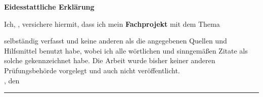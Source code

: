 \clearpage
\vspace*{\fill}
\LARGE{\textbf{Eidesstattliche Erklärung}}\\[1ex]
\normalsize



Ich, \authorName, versichere hiermit, dass ich mein \textbf{Fachprojekt} mit dem
Thema
\begin{quote}
\textit{\completeTitle}
\end{quote}
selbständig verfasst und keine anderen als die angegebenen Quellen und Hilfsmittel benutzt habe,
wobei ich alle wörtlichen und sinngemäßen Zitate als solche gekennzeichnet habe. Die Arbeit
wurde bisher keiner anderen Prüfungsbehörde vorgelegt und auch nicht veröffentlicht.\\[1ex]

\deliveryPlace, den \deadline

\rule[0.2cm]{5.5cm}{0.5pt}

\textsc{\authorName}
